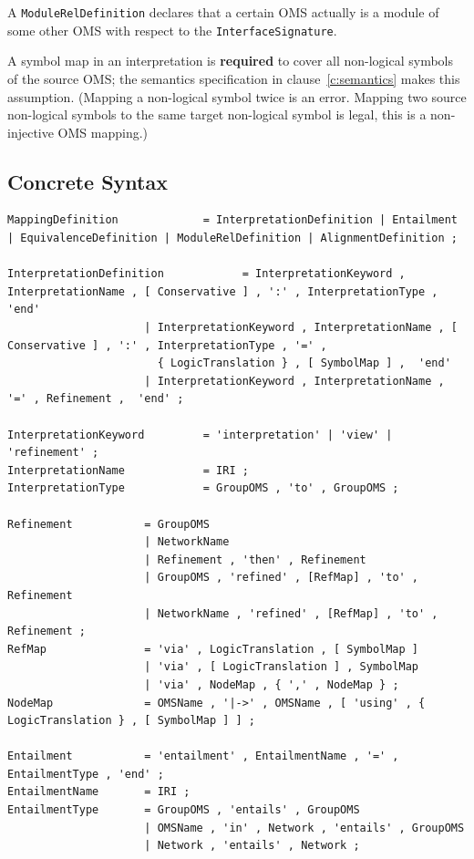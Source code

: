 \documentclass[10pt,fleqn,final]{scrreprt}
\newcommand*{\syntax}[1]{\texttt{#1}}
\newcommand*{\required}{\textbf{required}\xspace}
\newcommand{\clauserefname}{clause}
\newcommand{\cref}[1]{\clauserefname~\ref{#1}}
\newcommand{\ssclause}[1]{\subsection{#1}}
\newenvironment{definitions}[0]{\medskip }{}
\begin{document}
\begin{definitions}
A \syntax{ModuleRelDefinition} declares that a certain OMS
actually is a module of some other OMS with respect
to the \syntax{InterfaceSignature}.




A symbol map in an interpretation is \required to cover all non-logical symbols of the source OMS; 
the semantics specification in \cref{c:semantics} makes this assumption. ({Mapping a 
non-logical symbol twice is an error. Mapping two source non-logical symbols to the same target 
non-logical symbol is legal, this is a non-injective OMS mapping.})




\ssclause{Concrete Syntax}\label{a:dol-text:mappings}


\begin{lstlisting}[language=ebnf,mathescape]
MappingDefinition             = InterpretationDefinition | Entailment | EquivalenceDefinition | ModuleRelDefinition | AlignmentDefinition ;

InterpretationDefinition            = InterpretationKeyword , InterpretationName , [ Conservative ] , ':' , InterpretationType ,  'end'
                     | InterpretationKeyword , InterpretationName , [ Conservative ] , ':' , InterpretationType , '=' ,
                       { LogicTranslation } , [ SymbolMap ] ,  'end' 
                     | InterpretationKeyword , InterpretationName , '=' , Refinement ,  'end' ;

InterpretationKeyword         = 'interpretation' | 'view' | 'refinement' ;
InterpretationName            = IRI ;
InterpretationType            = GroupOMS , 'to' , GroupOMS ;

Refinement           = GroupOMS 
                     | NetworkName
                     | Refinement , 'then' , Refinement
                     | GroupOMS , 'refined' , [RefMap] , 'to' , Refinement 
                     | NetworkName , 'refined' , [RefMap] , 'to' , Refinement ;
RefMap               = 'via' , LogicTranslation , [ SymbolMap ]
                     | 'via' , [ LogicTranslation ] , SymbolMap
                     | 'via' , NodeMap , { ',' , NodeMap } ;
NodeMap              = OMSName , '|->' , OMSName , [ 'using' , { LogicTranslation } , [ SymbolMap ] ] ;

Entailment           = 'entailment' , EntailmentName , '=' , EntailmentType , 'end' ;
EntailmentName       = IRI ;
EntailmentType       = GroupOMS , 'entails' , GroupOMS
                     | OMSName , 'in' , Network , 'entails' , GroupOMS
                     | Network , 'entails' , Network ;


\end{lstlisting}
\end{definitions}
\end{document}
